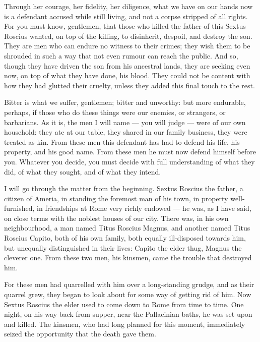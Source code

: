  Through her courage, her fidelity, her diligence, what we have on our hands now is a defendant accused while still living, and not a corpse stripped of all rights. For you must know, gentlemen, that those who killed the father of this Sextus Roscius wanted, on top of the killing, to disinherit, despoil, and destroy the son. They are men who can endure no witness to their crimes; they wish them to be shrouded in such a way that not even rumour can reach the public. And so, though they have driven the son from his ancestral lands, they are seeking even now, on top of what they have done, his blood. They could not be content with how they had glutted their cruelty, unless they added this final touch to the rest.

 Bitter is what we suffer, gentlemen; bitter and unworthy: but more endurable, perhaps, if those who do these things were our enemies, or strangers, or barbarians. As it is, the men I will name --- you will judge --- were of our own household: they ate at our table, they shared in our family business, they were treated as kin. From these men this defendant has had to defend his life, his property, and his good name. From these men he must now defend himself before you. Whatever you decide, you must decide with full understanding of what they did, of what they sought, and of what they intend.

 I will go through the matter from the beginning. Sextus Roscius the father, a citizen of Ameria, in standing the foremost man of his town, in property well-furnished, in friendships at Rome very richly endowed --- he was, as I have said, on close terms with the noblest houses of our city. There was, in his own neighbourhood, a man named Titus Roscius Magnus, and another named Titus Roscius Capito, both of his own family, both equally ill-disposed towards him, but unequally distinguished in their lives: Capito the elder thug, Magnus the cleverer one. From these two men, his kinsmen, came the trouble that destroyed him.

 For these men had quarrelled with him over a long-standing grudge, and as their quarrel grew, they began to look about for some way of getting rid of him. Now Sextus Roscius the elder used to come down to Rome from time to time. One night, on his way back from supper, near the Pallacinian baths, he was set upon and killed. The kinsmen, who had long planned for this moment, immediately seized the opportunity that the death gave them.

